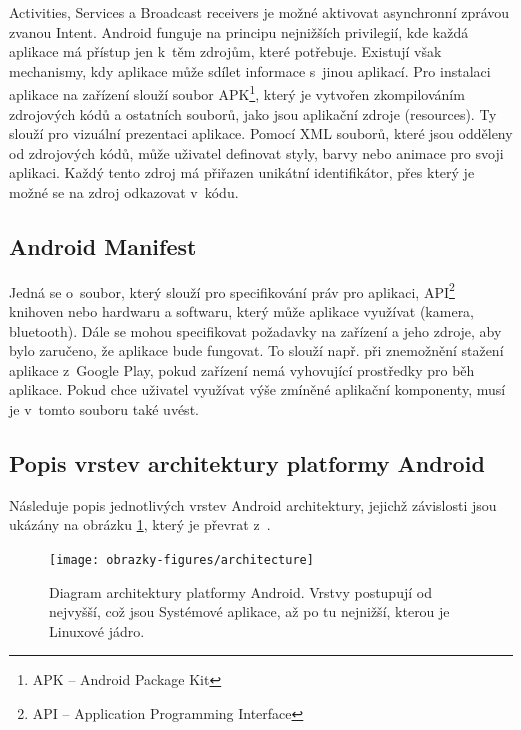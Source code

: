 Activities, Services a Broadcast receivers je možné aktivovat asynchronní zprávou zvanou Intent. Android funguje na principu nejnižších privilegií, kde každá aplikace má přístup jen k~těm zdrojům, které potřebuje. Existují však mechanismy, kdy aplikace může sdílet informace s~jinou aplikací. Pro instalaci aplikace na zařízení slouží soubor APK\footnote{APK -- Android Package Kit}, který je vytvořen zkompilováním zdrojových kódů a ostatních souborů, jako jsou aplikační zdroje (resources). Ty slouží pro vizuální prezentaci aplikace. Pomocí XML souborů, které jsou odděleny od zdrojových kódů, může uživatel definovat styly, barvy nebo animace pro svoji aplikaci. Každý tento zdroj má přiřazen unikátní identifikátor, přes který je možné se na zdroj odkazovat v~kódu.

\subsection*{Android Manifest}

Jedná se o~soubor, který slouží pro specifikování práv pro aplikaci, API\footnote{API -- Application Programming Interface} knihoven nebo  hardwaru a softwaru, který může aplikace využívat (kamera, bluetooth). Dále se mohou specifikovat požadavky na zařízení a jeho zdroje, aby bylo zaručeno, že aplikace bude fungovat. To slouží např. při znemožnění stažení aplikace z~Google Play, pokud zařízení nemá vyhovující prostředky pro běh aplikace. Pokud chce uživatel využívat výše zmíněné aplikační komponenty, musí je v~tomto souboru také uvést.
 
\subsection*{Popis vrstev architektury platformy Android}

Následuje popis jednotlivých vrstev Android architektury, jejichž závislosti jsou ukázány na obrázku \ref{archi}, který je převrat z~\cite{android}.

\begin{figure}[t]
\centering
\texttt{[image: obrazky-figures/architecture]}
\caption{Diagram architektury platformy Android. Vrstvy postupují od nejvyšší, což jsou Systémové aplikace, až po tu nejnižší, kterou je Linuxové jádro.}
\label{archi}
\end{figure}

